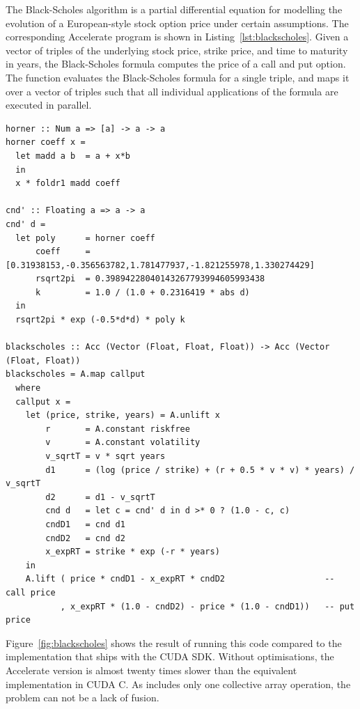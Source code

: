 The Black-Scholes algorithm is a partial differential equation for modelling the
evolution of a European-style stock option price under certain assumptions. The
corresponding Accelerate program is shown in Listing~\ref{lst:blackscholes}.
Given a vector of triples of the underlying stock price, strike price, and time
to maturity in years, the Black-Scholes formula computes the price of a call and
put option. The function  evaluates the Black-Scholes formula for
a single triple, and  maps it over a vector of triples such
that all individual applications of the formula are executed in parallel.
%
\begin{lstlisting}[style=haskell
    ,float
    ,label=lst:blackscholes
    ,caption={Black-Scholes option pricing in Accelerate}]
horner :: Num a => [a] -> a -> a
horner coeff x =
  let madd a b  = a + x*b
  in
  x * foldr1 madd coeff

cnd' :: Floating a => a -> a
cnd' d =
  let poly      = horner coeff
      coeff     = [0.31938153,-0.356563782,1.781477937,-1.821255978,1.330274429]
      rsqrt2pi  = 0.39894228040143267793994605993438
      k         = 1.0 / (1.0 + 0.2316419 * abs d)
  in
  rsqrt2pi * exp (-0.5*d*d) * poly k

blackscholes :: Acc (Vector (Float, Float, Float)) -> Acc (Vector (Float, Float))
blackscholes = A.map callput
  where
  callput x =
    let (price, strike, years) = A.unlift x
        r       = A.constant riskfree
        v       = A.constant volatility
        v_sqrtT = v * sqrt years
        d1      = (log (price / strike) + (r + 0.5 * v * v) * years) / v_sqrtT
        d2      = d1 - v_sqrtT
        cnd d   = let c = cnd' d in d >* 0 ? (1.0 - c, c)
        cndD1   = cnd d1
        cndD2   = cnd d2
        x_expRT = strike * exp (-r * years)
    in
    A.lift ( price * cndD1 - x_expRT * cndD2                    -- call price
           , x_expRT * (1.0 - cndD2) - price * (1.0 - cndD1))   -- put price
\end{lstlisting}

Figure~\ref{fig:blackscholes} shows the result of running this code compared to
the implementation that ships with the CUDA SDK. Without optimisations, the
Accelerate version is almost twenty times slower than the equivalent
implementation in CUDA C. As  includes only one collective
array operation, the problem can not be a lack of fusion.

